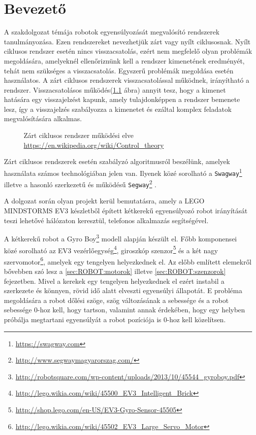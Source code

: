 \chapter{Bevezető}
A szakdolgozat témája robotok egyensúlyozását megvalósító rendszerek tanulmányozása. Ezen rendszereket nevezhetjük zárt vagy nyílt ciklusosnak. Nyílt ciklusos rendszer esetén nincs visszacsatolás, ezért nem megfelelő olyan problémák megoldására, amelyeknél ellenőriznünk kell a rendszer kimenetének eredményét, tehát nem szükséges a visszacsatolás. Egyszerű problémák megoldása esetén használatos. A zárt ciklusos rendszerek visszacsatolással működnek, irányítható a rendszer. Visszacsatolásos működés(\ref{fig:closeLoop} ábra) annyit tesz, hogy a kimenet hatására egy visszajelzést kapunk, amely tulajdonképpen a rendszer bemenete lesz, így a visszajelzés szabályozza a kimenetet és ezáltal komplex feladatok megvalósítására alkalmas.

\begin{figure}[!htb]
	\centering
	\caption[Zárt ciklusos rendszer működési elve.]
	{Zárt ciklusos rendszer működési elve \href{https://en.wikipedia.org/wiki/Control\_theory}{https://en.wikipedia.org/wiki/Control\_theory}}
	\label{fig:closeLoop}
\end{figure}

Zárt ciklusos rendszerek esetén szabályzó algoritmusról beszélünk, amelyek használata számos technológiában jelen van. Ilyenek közé sorolható a \texttt{Swagway}\footnote{\href{https://swagway.com}{https://swagway.com}} illetve a hasonló szerkezetű és működésű \texttt{Segway}\footnote{\href{http://www.segwaymagyarorszag.com/}{http://www.segwaymagyarorszag.com/}} .

A dolgozat során olyan projekt kerül bemutatásra, amely a LEGO MINDSTORMS EV3\cite{mindstormsEv3} készletből épített kétkerekű egyensúlyozó robot irányítását teszi lehetővé hálózaton keresztül, telefonos alkalmazás segítségével. 

A kétkerekű robot a Gyro Boy\footnote{\href{http://robotsquare.com/wp-content/uploads/2013/10/45544\_gyroboy.pdf}{http://robotsquare.com/wp-content/uploads/2013/10/45544\_gyroboy.pdf}} modell alapján készült el. Főbb komponensei közé sorolható az EV3 vezérlőegység\footnote{\href{http://lego.wikia.com/wiki/45500\_EV3\_Intelligent\_Brick}{http://lego.wikia.com/wiki/45500\_EV3\_Intelligent\_Brick}}, giroszkóp szenzor\footnote{\href{http://shop.lego.com/en-US/EV3-Gyro-Sensor-45505}{http://shop.lego.com/en-US/EV3-Gyro-Sensor-45505}} és a két nagy szervomotor\footnote{\href{http://lego.wikia.com/wiki/45502\_EV3\_Large\_Servo\_Motor}{http://lego.wikia.com/wiki/45502\_EV3\_Large\_Servo\_Motor}}, amelyek egy tengelyen helyezkednek el. Az előbb említett elemekről bővebben szó lesz a \ref{sec:ROBOT:motorok} illetve \ref{sec:ROBOT:szenzorok} fejezetben. Mivel a kerekek egy tengelyen helyezkednek el ezért instabil a szerkezete és könnyen, rövid idő alatt elveszti egyensúlyi állapotát. E probléma megoldására a robot dőlési szöge, szög változásának a sebessége és a robot sebessége 0-hoz kell, hogy tartson, valamint annak érdekében, hogy egy helyben próbálja megtartani egyensúlyát a robot pozíciója is 0-hoz kell közelítsen. 

